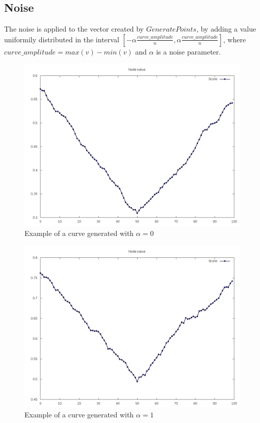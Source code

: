 \documentclass[12pt]{article}
\begin{document}
\subsection{Noise}
The noise is applied to the vector created by $GeneratePoints$, by adding a value uniformily distributed in the interval 
$[-\alpha \frac{curve\_amplitude}{n}, \alpha \frac{curve\_amplitude}{n}]$, where $curve\_amplitude = max(v) - min (v)$ and $\alpha$ is a noise parameter.

\begin{figure}[H]
\caption{Example of a curve generated with $\alpha = 0$}
\centering
\includegraphics[scale=.5]{alpha_zero_curve}
\end{figure}

\begin{figure}[H]
\caption{Example of a curve generated with $\alpha = 1$}
\centering
\includegraphics[scale=.5]{alpha_one_curve}
\end{figure}
\end{document}
